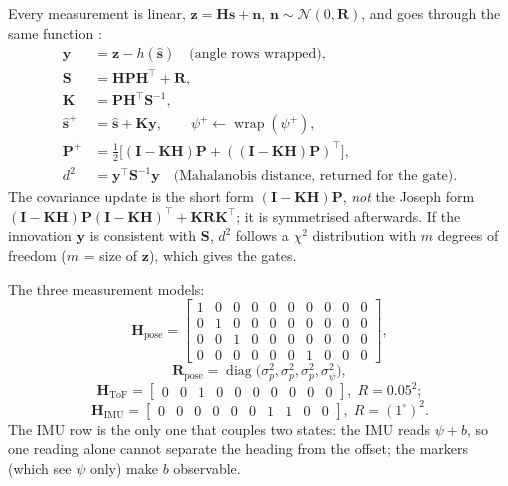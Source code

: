 Every measurement is linear, $\mathbf z = \mathbf H\mathbf s + \mathbf n$, $\mathbf n\sim\mathcal N(0,\mathbf R)$, and goes
through the same function :
\begin{align}
  \mathbf y &= \mathbf z - h(\hat{\mathbf s}) \quad\text{(angle rows wrapped)}, \label{eq:innov}\\
  \mathbf S &= \mathbf H\mathbf P\mathbf H^\top + \mathbf R, \\
  \mathbf K &= \mathbf P\mathbf H^\top\mathbf S^{-1}, \\
  \hat{\mathbf s}^+ &= \hat{\mathbf s} + \mathbf K\mathbf y, \qquad \psi^+ \leftarrow \operatorname{wrap}(\psi^+), \\
  \mathbf P^+ &= \tfrac12\big[(\mathbf I - \mathbf K\mathbf H)\mathbf P + ((\mathbf I - \mathbf K\mathbf H)\mathbf P)^\top\big], \\
  d^2 &= \mathbf y^\top\mathbf S^{-1}\mathbf y \quad\text{(Mahalanobis distance, returned for the gate)}.
\end{align}
The covariance update is the short form $(\mathbf I-\mathbf K\mathbf H)\mathbf P$, \emph{not} the Joseph form
$(\mathbf I-\mathbf K\mathbf H)\mathbf P(\mathbf I-\mathbf K\mathbf H)^\top+\mathbf K\mathbf R\mathbf K^\top$; it is
symmetrised afterwards. If the innovation $\mathbf y$ is consistent with $\mathbf S$, $d^2$ follows a $\chi^2$
distribution with $m$ degrees of freedom ($m$ = size of $\mathbf z$), which gives the gates.

The three measurement models:
\begin{equation}
\mathbf H_{\text{pose}} =
\begin{bmatrix}
1&0&0&0&0&0&0&0&0&0\\
0&1&0&0&0&0&0&0&0&0\\
0&0&1&0&0&0&0&0&0&0\\
0&0&0&0&0&0&1&0&0&0
\end{bmatrix},
\end{equation}
\begin{equation}
\mathbf R_{\text{pose}} = \operatorname{diag}\big(\sigma_p^2,\sigma_p^2,\sigma_p^2,\sigma_\psi^2\big),
\end{equation}
\begin{equation}
\mathbf H_{\text{ToF}} = \begin{bmatrix}0&0&1&0&0&0&0&0&0&0\end{bmatrix},\; R = 0.05^2;
\end{equation}
\begin{equation}
\mathbf H_{\text{IMU}} = \begin{bmatrix}0&0&0&0&0&0&1&1&0&0\end{bmatrix},\; R = (1^\circ)^2 .
\end{equation}
The IMU row is the only one that couples two states: the IMU reads $\psi+b$, so one reading alone cannot separate the
heading from the offset; the markers (which see $\psi$ only) make $b$ observable.

